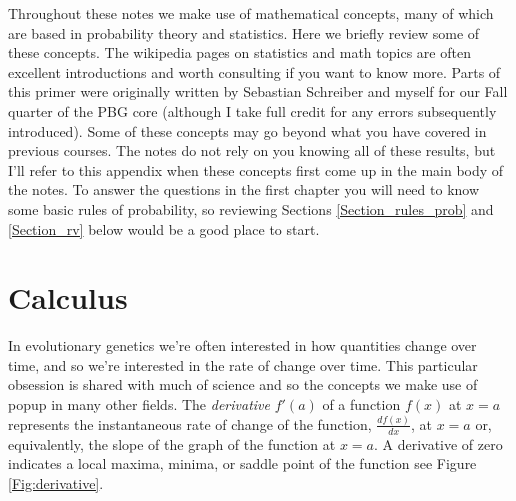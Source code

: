 Throughout these notes we make use of mathematical concepts, many of
which are based in probability theory and statistics. Here we briefly
review some of these concepts. The wikipedia pages on
statistics and math topics are often excellent introductions and
worth consulting if you want to know more. Parts of this primer were originally written by
Sebastian Schreiber and myself for our Fall quarter of the PBG core
(although I take full credit for any errors subsequently introduced).
Some of these concepts may go beyond what you have covered in previous
courses. The notes do not rely on you knowing all of these results, but I'll refer to this appendix when these concepts first come
up in the main body of the notes. To answer the questions in the first
chapter you will need to know some basic rules of probability, so
reviewing Sections \ref{Section_rules_prob} and \ref{Section_rv} below
would be  a good place to start.



\section{Calculus} \label{section:calculus}
In evolutionary genetics we're often interested in how quantities
change over time, and so we're interested in the rate of change over
time. This particular obsession is shared with much of
science and so the concepts we make use of popup in many other fields. 
The \emph{derivative} $f'(a)$ of a function $f(x)$ at $x=a$ represents
the instantaneous rate of change of the function, $\frac{df(x)}{dx}$, at $x=a$ or,
equivalently, the slope of the graph of the function at $x=a$. A
derivative of zero indicates a local maxima, minima, or saddle point of the function see Figure \ref{Fig:derivative}.
    
